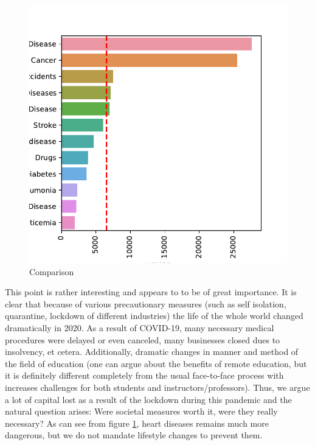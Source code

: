 \documentclass[conference]{IEEEtran}
\begin{document}
\begin{figure}
  \centering
  \includegraphics[width=0.9\columnwidth]{figs/yearly_deaths}
  \caption{Comparison}
  \label{fig:yearly_deaths}
\end{figure}


This point is rather interesting and appears to to be of great importance. It is clear that because of various precautionary measures (such as self isolation, quarantine, lockdown of different industries) the life of the whole world changed dramatically in 2020. As a result of COVID-19, many necessary medical procedures were delayed or even canceled, many businesses closed dues to insolvency, et cetera. Additionally, dramatic changes in manner and method of the field of education (one can argue about the benefits of remote education, but it is definitely different completely from the usual face-to-face process with increases challenges for both students and instructors/professors). Thus, we argue a lot of capital lost as a result of the lockdown during this pandemic and the natural question arises: Were societal measures worth it, were they really necessary? As can see from figure \ref{fig:yearly_deaths}, heart diseases remains much more dangerous, but we do not mandate lifestyle changes to prevent them.
\end{document}
